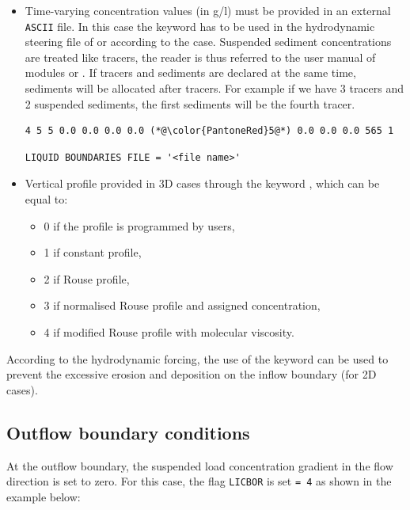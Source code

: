 \begin{itemize}
\begin{lstlisting}[frame=trBL]
4 5 5 0.0 0.0 0.0 0.0 (*@\color{PantoneRed}5@*) 0.0 0.0 0.0 565 1
\end{lstlisting}
\begin{lstlisting}[frame=trBL]
EQUILIBRIUM INFLOW CONCENTRATION = YES
SUSPENSION TRANSPORT FORMULA FOR ALL SANDS = 1
\end{lstlisting}
\item Time-varying concentration values (in g/l) must be provided in an external \texttt{ASCII} file. In this case the keyword  has to be used in the hydrodynamic steering file of  or  according to the case. Suspended sediment concentrations are treated like tracers, the reader is thus referred to the user manual of modules  or .
If tracers and sediments are declared at the same time, sediments will be allocated after tracers. For example if we have 3 tracers and 2 suspended sediments, the first sediments will be the fourth tracer.
\begin{lstlisting}[frame=trBL]
4 5 5 0.0 0.0 0.0 0.0 (*@\color{PantoneRed}5@*) 0.0 0.0 0.0 565 1
\end{lstlisting}
\begin{lstlisting}[frame=trBL]
LIQUID BOUNDARIES FILE = '<file name>'
\end{lstlisting}
\item Vertical profile provided in 3D cases through the keyword , which can be equal to:
\begin{itemize}
\item 0 if the profile is programmed by users,
\item 1 if constant profile,
\item 2 if Rouse profile,
\item 3 if normalised Rouse profile and assigned concentration,
\item 4 if modified Rouse profile with molecular viscosity.
\end{itemize}
\end{itemize}

According to the hydrodynamic forcing, the use of the keyword  can be used to prevent the excessive erosion and deposition on the inflow boundary (for 2D cases).

\subsection{Outflow boundary conditions}
At the outflow boundary, the suspended load concentration gradient in the flow direction is set to zero. For this case, the flag \texttt{LICBOR} is set \texttt{= 4} as shown in the example below:

